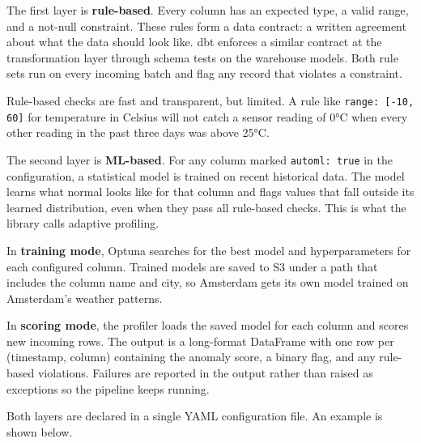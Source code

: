 \documentclass[12pt]{article}
\begin{document}
The first layer is \textbf{rule-based}. Every column has an expected type, a valid range, and a not-null constraint. These rules form a data contract: a written agreement about what the data should look like. dbt enforces a similar contract at the transformation layer through schema tests on the warehouse models. Both rule sets run on every incoming batch and flag any record that violates a constraint.

Rule-based checks are fast and transparent, but limited. A rule like \texttt{range: [-10, 60]} for temperature in Celsius will not catch a sensor reading of 0°C when every other reading in the past three days was above 25°C.

The second layer is \textbf{ML-based}. For any column marked \texttt{automl: true} in the configuration, a statistical model is trained on recent historical data. The model learns what normal looks like for that column and flags values that fall outside its learned distribution, even when they pass all rule-based checks. This is what the library calls adaptive profiling.

In \textbf{training mode}, Optuna searches for the best model and hyperparameters for each configured column. Trained models are saved to S3 under a path that includes the column name and city, so Amsterdam gets its own model trained on Amsterdam's weather patterns.

In \textbf{scoring mode}, the profiler loads the saved model for each column and scores new incoming rows. The output is a long-format DataFrame with one row per (timestamp, column) containing the anomaly score, a binary flag, and any rule-based violations. Failures are reported in the output rather than raised as exceptions so the pipeline keeps running.

Both layers are declared in a single YAML configuration file. An example is shown below.

\newpage
\end{document}
